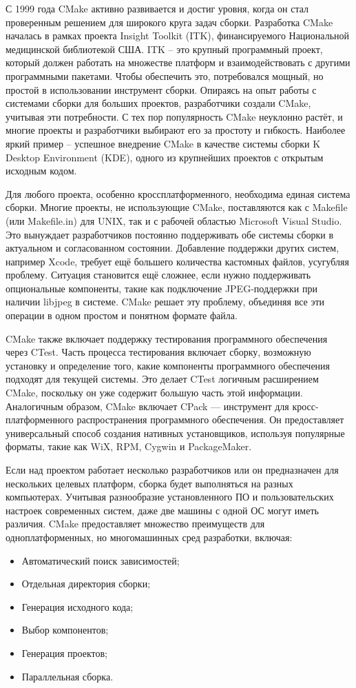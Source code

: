 С 1999 года CMake активно развивается и достиг уровня, когда он стал проверенным решением для широкого круга задач сборки. Разработка CMake началась в рамках проекта Insight Toolkit (ITK), финансируемого Национальной медицинской библиотекой США. ITK -- это крупный программный проект, который должен работать на множестве платформ и взаимодействовать с другими программными пакетами. Чтобы обеспечить это, потребовался мощный, но простой в использовании инструмент сборки. Опираясь на опыт работы с системами сборки для больших проектов, разработчики создали CMake, учитывая эти потребности. С тех пор популярность CMake неуклонно растёт, и многие проекты и разработчики выбирают его за простоту и гибкость. Наиболее яркий пример -- успешное внедрение CMake в качестве системы сборки K Desktop Environment (KDE), одного из крупнейших проектов с открытым исходным кодом.

Для любого проекта, особенно кроссплатформенного, необходима единая система сборки. Многие проекты, не использующие CMake, поставляются как с Makefile (или Makefile.in) для UNIX, так и с рабочей областью Microsoft Visual Studio. Это вынуждает разработчиков постоянно поддерживать обе системы сборки в актуальном и согласованном состоянии. Добавление поддержки других систем, например Xcode, требует ещё большего количества кастомных файлов, усугубляя проблему. Ситуация становится ещё сложнее, если нужно поддерживать опциональные компоненты, такие как подключение JPEG-поддержки при наличии libjpeg в системе. CMake решает эту проблему, объединяя все эти операции в одном простом и понятном формате файла.

CMake также включает поддержку тестирования программного обеспечения через CTest. Часть процесса тестирования включает сборку, возможную установку и определение того, какие компоненты программного обеспечения подходят для текущей системы. Это делает CTest логичным расширением CMake, поскольку он уже содержит большую часть этой информации. Аналогичным образом, CMake включает CPack — инструмент для кросс-платформенного распространения программного обеспечения. Он предоставляет универсальный способ создания нативных установщиков, используя популярные форматы, такие как WiX, RPM, Cygwin и PackageMaker.

Если над проектом работает несколько разработчиков или он предназначен для нескольких целевых платформ, сборка будет выполняться на разных компьютерах. Учитывая разнообразие установленного ПО и пользовательских настроек современных систем, даже две машины с одной ОС могут иметь различия. CMake предоставляет множество преимуществ для одноплатформенных, но многомашинных сред разработки, включая:
\begin{itemize}
	\item Автоматический поиск зависимостей;
	\item Отдельная директория сборки;
	\item Генерация исходного кода;
	\item Выбор компонентов;
	\item Генерация проектов;
	\item Параллельная сборка.
\end{itemize}

